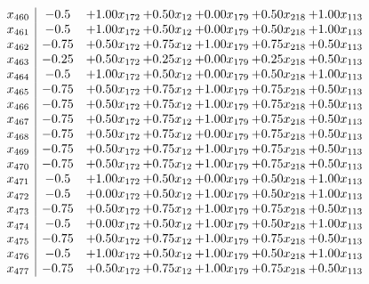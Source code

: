 \documentclass[8pt]{article}
\begin{document}
\[\begin{array}{c| c c@{\hskip 2pt} c@{\hskip 2pt} c@{\hskip 2pt} c@{\hskip 2pt} c@{\hskip 2pt} }
 x_{460}   &  -0.5 & +  1.00 x_{172} & +  0.50 x_{12} & +  0.00 x_{179} & +  0.50 x_{218} & +  1.00 x_{113}\\
 x_{461}   &  -0.5 & +  1.00 x_{172} & +  0.50 x_{12} & +  0.00 x_{179} & +  0.50 x_{218} & +  1.00 x_{113}\\
 x_{462}   &  -0.75 & +  0.50 x_{172} & +  0.75 x_{12} & +  1.00 x_{179} & +  0.75 x_{218} & +  0.50 x_{113}\\
 x_{463}   &  -0.25 & +  0.50 x_{172} & +  0.25 x_{12} & +  0.00 x_{179} & +  0.25 x_{218} & +  0.50 x_{113}\\
 x_{464}   &  -0.5 & +  1.00 x_{172} & +  0.50 x_{12} & +  0.00 x_{179} & +  0.50 x_{218} & +  1.00 x_{113}\\
 x_{465}   &  -0.75 & +  0.50 x_{172} & +  0.75 x_{12} & +  1.00 x_{179} & +  0.75 x_{218} & +  0.50 x_{113}\\
 x_{466}   &  -0.75 & +  0.50 x_{172} & +  0.75 x_{12} & +  1.00 x_{179} & +  0.75 x_{218} & +  0.50 x_{113}\\
 x_{467}   &  -0.75 & +  0.50 x_{172} & +  0.75 x_{12} & +  1.00 x_{179} & +  0.75 x_{218} & +  0.50 x_{113}\\
 x_{468}   &  -0.75 & +  0.50 x_{172} & +  0.75 x_{12} & +  0.00 x_{179} & +  0.75 x_{218} & +  0.50 x_{113}\\
 x_{469}   &  -0.75 & +  0.50 x_{172} & +  0.75 x_{12} & +  1.00 x_{179} & +  0.75 x_{218} & +  0.50 x_{113}\\
 x_{470}   &  -0.75 & +  0.50 x_{172} & +  0.75 x_{12} & +  1.00 x_{179} & +  0.75 x_{218} & +  0.50 x_{113}\\
 x_{471}   &  -0.5 & +  1.00 x_{172} & +  0.50 x_{12} & +  0.00 x_{179} & +  0.50 x_{218} & +  1.00 x_{113}\\
 x_{472}   &  -0.5 & +  0.00 x_{172} & +  0.50 x_{12} & +  1.00 x_{179} & +  0.50 x_{218} & +  1.00 x_{113}\\
 x_{473}   &  -0.75 & +  0.50 x_{172} & +  0.75 x_{12} & +  1.00 x_{179} & +  0.75 x_{218} & +  0.50 x_{113}\\
 x_{474}   &  -0.5 & +  0.00 x_{172} & +  0.50 x_{12} & +  1.00 x_{179} & +  0.50 x_{218} & +  1.00 x_{113}\\
 x_{475}   &  -0.75 & +  0.50 x_{172} & +  0.75 x_{12} & +  1.00 x_{179} & +  0.75 x_{218} & +  0.50 x_{113}\\
 x_{476}   &  -0.5 & +  1.00 x_{172} & +  0.50 x_{12} & +  1.00 x_{179} & +  0.50 x_{218} & +  1.00 x_{113}\\
 x_{477}   &  -0.75 & +  0.50 x_{172} & +  0.75 x_{12} & +  1.00 x_{179} & +  0.75 x_{218} & +  0.50 x_{113}\\

\end{array}\]
\end{document}
